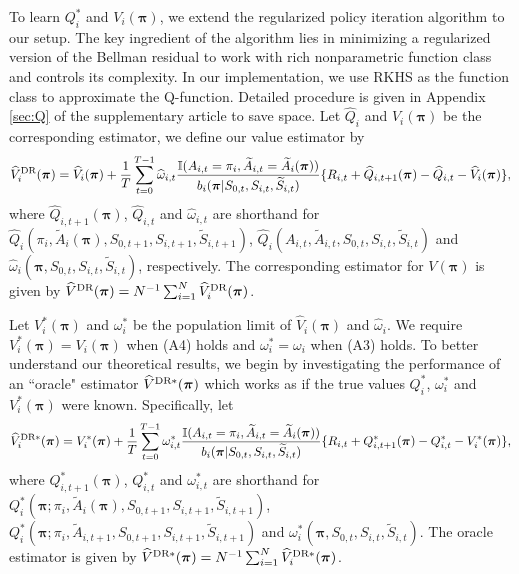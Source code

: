 \documentclass{article}
\begin{document}
To learn $Q_i^*$ and $V_i(\bm{\pi})$, we extend the regularized policy iteration algorithm \citep{Farah2016,liao2019off} to our setup.  The key ingredient of the algorithm lies in minimizing a regularized version of the Bellman residual to work with rich nonparametric function class and controls its complexity. In our implementation, we use RKHS as the function class to approximate the Q-function. Detailed procedure is given in Appendix \ref{sec:Q} of the supplementary article to save space. Let $\widehat{Q}_i$ and $\widehat{V}_i(\bm{\pi})$ be the corresponding estimator, we define our value estimator by
\begin{eqnarray*}
\widehat{V}^{\hbox{\scriptsize{DR}}}_i(\bm{\pi})=\widehat{V}_i(\bm{\pi})+\frac{1}{T}\sum_{t=0}^{T-1} \widehat{\omega}_{i,t}\frac{\mathbb{I}(A_{i,t}=\pi_i,\widetilde{A}_{i,t}=\widetilde{A}_i(\bm{\pi}))}{b_i(\bm{\pi}|S_{0,t},S_{i,t},\widetilde{S}_{i,t})}
 \{R_{i,t}+\widehat{Q}_{i,t+1}(\bm{\pi})-\widehat{Q}_{i,t}-\widehat{V}_i(\bm{\pi})\},
\end{eqnarray*}
where $\widehat{Q}_{i,t+1}(\bm{\pi})$, $\widehat{Q}_{i,t}$ and $\widehat{\omega}_{i,t}$ are shorthand for $\widehat{Q}_i(\pi_i,\widetilde{A}_i(\bm{\pi}),S_{0,t+1},S_{i,t+1},\widetilde{S}_{i,t+1})$, $\widehat{Q}_i(A_{i,t},\widetilde{A}_{i,t},S_{0,t},S_{i,t},\widetilde{S}_{i,t})$ and $\widehat{\omega}_i(\bm{\pi},S_{0,t},S_{i,t},\widetilde{S}_{i,t})$, respectively. The corresponding estimator for $V(\bm{\pi})$ is given by $\widehat{V}^{\hbox{\scriptsize{DR}}}(\bm{\pi})=N^{-1} \sum_{i=1}^N \widehat{V}^{\hbox{\scriptsize{DR}}}_i(\bm{\pi})$. 

Let $V_i^*(\bm{\pi})$ and $\omega_i^*$ be the population limit of $\widehat{V}_i(\bm{\pi})$ and $\widehat{\omega}_i$. We require $V_i^*(\bm{\pi})=V_i(\bm{\pi})$ when (A4) holds and $\omega_i^*=\omega_i$ when (A3) holds. To better understand our theoretical results, we begin by investigating the performance of an ``oracle" estimator $\widehat{V}^{\hbox{\scriptsize{DR}}*}(\bm{\pi})$ which works as if  the true values $Q_i^*$, $\omega_i^*$ and $V_i^*(\bm{\pi})$ were known. Specifically, let
\vspace{-0.1cm}
\begin{eqnarray*}
\widehat{V}_i^{\hbox{\scriptsize{DR}}*}(\bm{\pi})=V_i^*(\bm{\pi})+\frac{1}{T}\sum_{t=0}^{T-1} \omega_{i,t}^*\frac{\mathbb{I}(A_{i,t}=\pi_i,\widetilde{A}_{i,t}=\widetilde{A}_i(\bm{\pi}))}{b_i(\bm{\pi}|S_{0,t},S_{i,t},\widetilde{S}_{i,t})}
\{R_{i,t}+Q_{i,t+1}^*(\bm{\pi})-Q_{i,t}^*-V_i^*(\bm{\pi})\},
\end{eqnarray*}
where $Q_{i,t+1}^*(\bm{\pi})$, $Q_{i,t}^*$ and $\omega_{i,t}^*$ are shorthand for $Q_i^*(\bm{\pi};\pi_i,\widetilde{A}_{i}(\bm{\pi}),S_{0,t+1},S_{i,t+1},\widetilde{S}_{i,t+1})$, $Q_i^*(\bm{\pi};\pi_i,\widetilde{A}_{i,t+1},S_{0,t+1},S_{i,t+1},\widetilde{S}_{i,t+1})$ and  $\omega_i^*(\bm{\pi},S_{0,t},S_{i,t},\widetilde{S}_{i,t})$. The oracle estimator is given by $\widehat{V}^{\hbox{\scriptsize{DR}}*}(\bm{\pi})=N^{-1}\sum_{i=1}^N \widehat{V}_i^{\hbox{\scriptsize{DR}}*}(\bm{\pi})$. 
\end{document}
